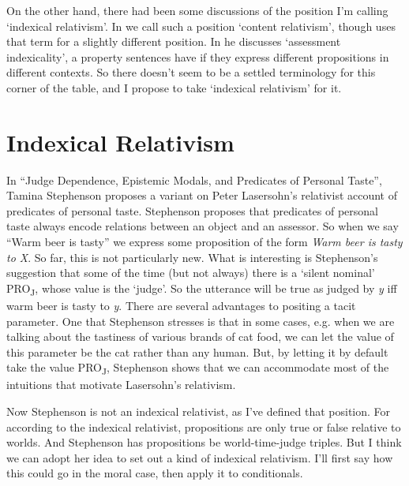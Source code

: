 On the other hand, there had been some discussions of the position I'm calling `indexical relativism'. In \citet{Egan2005-EGAEMI} we call such a position `content relativism', though \citet{Cappelen2008} uses that term for a slightly different position. In \citet{MacFarlane2005-MACMSO} he discusses `assessment indexicality', a property sentences have if they express different propositions in different contexts. So there doesn't seem to be a settled terminology for this corner of the table, and I propose to take `indexical relativism' for it.


\section{Indexical Relativism}

In ``Judge Dependence, Epistemic Modals, and Predicates of Personal Taste'', Tamina Stephenson proposes a variant on Peter Lasersohn's \citeyearpar{Lasersohn2005} relativist account of predicates of personal taste. Stephenson proposes that predicates of personal taste always encode relations between an object and an assessor. So when we say ``Warm beer is tasty'' we express some proposition of the form \textit{Warm beer is tasty to X}. So far, this is not particularly new. What is interesting is Stephenson's suggestion that some of the time (but not always) there is a `silent nominal' PRO\textsubscript{J}, whose value is the `judge'. So the utterance will be true as judged by \textit{y} iff warm beer is tasty to \textit{y}. There are several advantages to positing a tacit parameter. One that Stephenson stresses is that in some cases, e.g. when we are talking about the tastiness of various brands of cat food, we can let the value of this parameter be the cat rather than any human. But, by letting it by default take the value PRO\textsubscript{J}, Stephenson shows that we can accommodate most of the intuitions that motivate Lasersohn's relativism.

Now Stephenson is not an indexical relativist, as I've defined that position. For according to the indexical relativist, propositions are only true or false relative to worlds. And Stephenson has propositions be world-time-judge triples. But I think we can adopt her idea to set out a kind of indexical relativism. I'll first say how this could go in the moral case, then apply it to conditionals.

